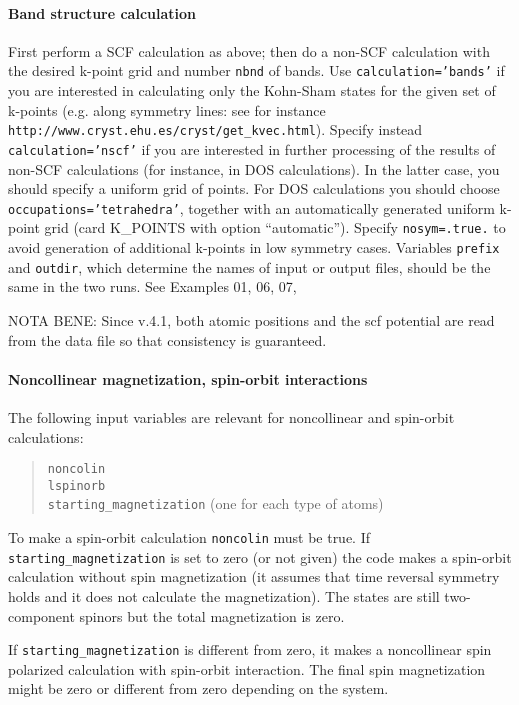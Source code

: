 \documentclass[12pt,a4paper]{article}
\begin{document}
\paragraph{Band structure calculation}
First perform a SCF calculation as above;
then do a non-SCF calculation with the desired k-point grid and 
number \texttt{nbnd} of bands. 
Use \texttt{calculation='bands'} if you are interested in calculating
only the Kohn-Sham states for the given set of k-points
(e.g. along symmetry lines: see for instance
\texttt{http://www.cryst.ehu.es/cryst/get\_kvec.html}). Specify instead
\texttt{calculation='nscf'} if you are interested in further processing 
of the results of non-SCF calculations (for instance, in DOS calculations).
In the latter case, you should specify a uniform grid of points.
For DOS calculations you should choose \texttt{occupations='tetrahedra'}, 
together with an automatically generated uniform k-point grid 
(card K\_POINTS with option ``automatic'').
Specify \texttt{nosym=.true.} to avoid generation of additional k-points in
low symmetry cases. Variables \texttt{prefix} and \texttt{outdir}, which determine
the names of input or output files, should be the same in the two runs.
See Examples 01, 06, 07,

NOTA BENE:  Since v.4.1, both atomic positions
and the scf
potential are read from the data file so that consistency is guaranteed.

\paragraph{Noncollinear magnetization, spin-orbit interactions}

The following input variables are relevant for noncollinear and
spin-orbit calculations: 
\begin{quote}
      \texttt{noncolin}\\
      \texttt{lspinorb}\\
      \texttt{starting\_magnetization} (one for each type of atoms)
\end{quote}
To make a spin-orbit calculation \texttt{noncolin} must be true. 
If \texttt{starting\_magnetization} is set to zero (or not given) 
the code makes a spin-orbit calculation without spin magnetization 
(it assumes that time reversal symmetry holds and it does not calculate 
the magnetization). The states are still two-component spinors but the
total magnetization is zero. 

If \texttt{starting\_magnetization} is different from zero, it makes a 
noncollinear spin polarized calculation with spin-orbit interaction. The 
final spin magnetization might be zero or different from zero depending 
on the system. 
\end{document}
